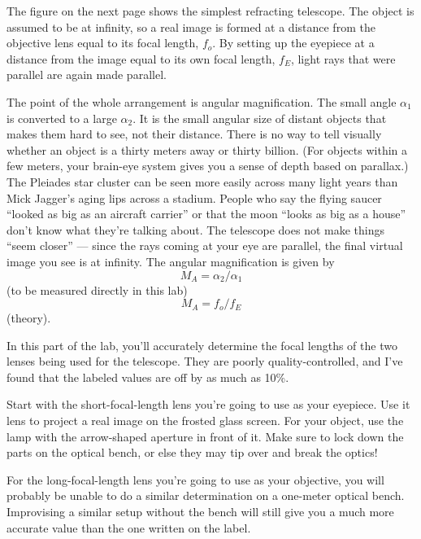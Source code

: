 \label{fig:telescope}

The figure on the next page
shows the simplest refracting telescope. The
object is assumed to be at infinity, so a real image is
formed at a distance from the objective lens equal to its
focal length, $f_o$. By setting up the eyepiece at a
distance from the image equal to its own focal length,
$f_E$, light rays that were parallel are again made parallel.

The point of the whole arrangement is angular magnification.
The small angle $\alpha_1$ is converted to a large
$\alpha_2$. It is the small angular size of distant objects
that makes them hard to see, not their distance. There is no
way to tell visually whether an object is a thirty meters
away or thirty billion. (For objects within a few meters,
your brain-eye system gives you a sense of depth based on
parallax.) The Pleiades star cluster can be seen more easily
across many light years than Mick Jagger's aging lips across
a stadium. People who say the flying saucer ``looked as big
as an aircraft carrier'' or that the moon ``looks as big as
a house'' don't know what they're talking about. The
telescope does not make things ``seem closer'' --- since the
rays coming at your eye are parallel, the final virtual
image you see is at infinity. The angular magnification is given by
\begin{equation*}
      M_A  =  \alpha_2/\alpha_1   
\end{equation*}
(to be measured directly in this lab)
\begin{equation*}
      M_A  =  f_o/f_E   
\end{equation*}
(theory).

\observations

In this part of the lab, you'll accurately determine the focal lengths of the two
lenses being used for the telescope. They are poorly quality-controlled, and I've
found that the labeled values are off by as much as 10\%.

Start with the short-focal-length lens you're going to use as your eyepiece.
Use it lens to project a real image on the
frosted glass screen. For your object, use the lamp with the
arrow-shaped aperture in front of it. Make sure to lock down
the parts on the optical bench, or else they may tip over
and break the optics!

For the long-focal-length lens you're going to use as your objective, you will
probably be unable to do a similar determination on a one-meter optical bench.
Improvising a similar setup without the bench will still give you a much more
accurate value than the one written on the label.

